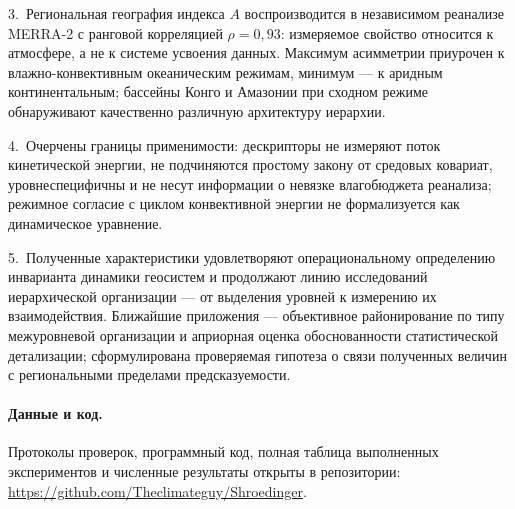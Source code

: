 \documentclass[11pt,a4paper]{article}
\begin{document}
3.~Региональная география индекса $A$ воспроизводится в независимом реанализе MERRA-2 с ранговой корреляцией $\rho=0{,}93$: измеряемое свойство относится к атмосфере, а не к системе усвоения данных. Максимум асимметрии приурочен к влажно-конвективным океаническим режимам, минимум --- к аридным континентальным; бассейны Конго и Амазонии при сходном режиме обнаруживают качественно различную архитектуру иерархии.

4.~Очерчены границы применимости: дескрипторы не измеряют поток кинетической энергии, не подчиняются простому закону от средовых ковариат, уровнеспецифичны и не несут информации о невязке влагобюджета реанализа; режимное согласие с циклом конвективной энергии не формализуется как динамическое уравнение.

5.~Полученные характеристики удовлетворяют операциональному определению инварианта динамики геосистем и продолжают линию исследований иерархической организации --- от выделения уровней к измерению их взаимодействия. Ближайшие приложения --- объективное районирование по типу межуровневой организации и априорная оценка обоснованности статистической детализации; сформулирована проверяемая гипотеза о связи полученных величин с региональными пределами предсказуемости.

\paragraph{Данные и код.} Протоколы проверок, программный код, полная таблица выполненных экспериментов и численные результаты открыты в репозитории: \url{https://github.com/Theclimateguy/Shroedinger}.

\printbibliography[title={Список литературы}]
\end{document}
